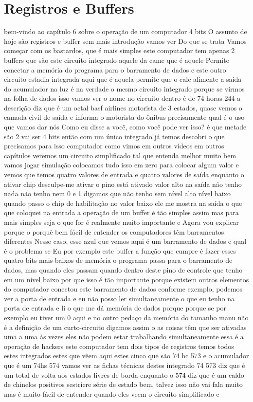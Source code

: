 \documentclass[oneside,11pt]{memoir} %
\begin{document}
\chapter{Registros e Buffers}
bem-vindo ao capítulo 6 sobre o  operação de um computador 4  bits  O assunto de hoje são registros e  buffer sem mais introdução vamos ver  Do que se trata  Vamos começar com os bastardos, que é mais  simples este computador tem  apenas 2 buffers que são este circuito  integrado aquele da came que é aquele  Permite conectar a memória do programa  para o barramento de dados e este outro circuito  estadia integrada aqui que é aquela  permite que o calc alimente a saída do  acumulador na luz é na verdade o  mesmo circuito integrado porque se virmos  na folha de dados  isso vamos ver o nome no circuito  dentro é de 74 horas 244 a descrição  diz que é um octal basf airlines  motorista de 3 estados, quase vemos o  camada civil de saída e informa o motorista do ônibus  precisamente qual é o uso que vamos dar  nós  Como eu disse a você, como você pode ver isso?  é que metade são 2 vai ser 4 bits  então com um único integrado já temos  descobri o que precisamos para isso  computador como vimos em outros vídeos  em outros capítulos veremos  um circuito simplificado tal que  entenda melhor  muito bem vamos jogar  simulação colocamos tudo isso em zero  para colocar algum valor e vemos que  temos quatro valores de entrada e  quatro valores de saída enquanto o  ativar chip  desculpe-me ativar o pino está ativado  valor alto na saída não tenho nada  não tenho nem 0 e 1 digamos que não tenho  sem nível alto nível baixo  quando passo o chip de habilitação  no valor baixo ele me mostra na saída o que  que coloquei na entrada  a operação de um buffer é tão  simples assim mas para mais simples  seja o que for é realmente muito importante e  Agora vou explicar porque  o porquê bem fácil de entender  os computadores têm barramentos diferentes  Nesse caso, esse azul que vemos aqui é  um barramento de dados e qual é o problema se  Eu por exemplo este buffer a função  que cumpre é fazer esses quatro  bits mais baixos de memória  o programa passa para o barramento de dados, mas  quando eles passam quando dentro deste pino  de controle que tenho em um nível baixo  por que isso é tão importante porque  existem outros elementos do computador  conectou este barramento de dados conforme  exemplo, podemos ver a porta de entrada  e eu não posso ler simultaneamente o que  eu tenho na porta de entrada e li  o que me dá memória de dados porque  porque se por exemplo eu tiver um 0 aqui  e no outro pedaço da memória do  tamanho manu não é a definição de um  curto-circuito digamos assim o  as coisas têm que ser ativadas uma a uma  às vezes eles não podem estar trabalhando  simultaneamente essa é a operação  de hackers  este computador tem dois tipos de  registros temos todos estes integrados  estes que vêem aqui estes cinco que são 74  hc 573 e o acumulador que é um 74hs  574  vamos ver as fichas técnicas destes  integrado 74 573 diz que é um total  de volta aos estados livres de borda  enquanto o 574 diz que é um  caldo de chinelos positivos sestriere  série de estado bem, talvez isso não vai  fala muito mas é muito fácil de entender  quando eles veem o circuito simplificado e  
\end{document}
